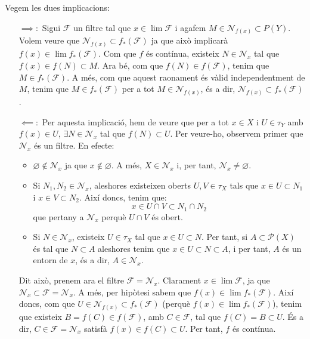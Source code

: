 \documentclass[10pt,a4paper]{article}
\begin{document}
\begin{enumerate}
            Vegem les dues implicacions:
            \begin{itemize}[leftmargin=0.95cm]
                  \item [$\implies:$] Sigui $\mathcal{F}$ un filtre tal que $x\in\lim\mathcal{F}$ i agafem $M\in\mathcal{N}_{f(x)}\subset P(Y)$. Volem veure que $\mathcal{N}_{f(x)}\subset f_*(\mathcal{F})$ ja que això implicarà $f(x)\in\lim f_*(\mathcal{F})$. Com que $f$ és contínua, existeix $N\in\mathcal{N}_x$ tal que $f(x)\in f(N)\subset M$. Ara bé, com que $f(N)\in f(\mathcal{F})$, tenim que $M\in f_*(\mathcal{F})$. A més, com que aquest raonament és vàlid independentment de $M$, tenim que $M\in f_*(\mathcal{F})$ per a tot $M\in\mathcal{N}_{f(x)}$, és a dir, $\mathcal{N}_{f(x)}\subset f_*(\mathcal{F})$.
                  \item [$\impliedby:$] Per aquesta implicació, hem de veure que per a tot $x\in X$ i $U\in\tau_Y$ amb $f(x)\in U$, $\exists N\in \mathcal{N}_x$ tal que $f(N)\subset U$. Per veure-ho, observem primer que $\mathcal{N}_x$ és un filtre. En efecte:
                        \begin{itemize}
                              \item $\varnothing\notin\mathcal{N}_x$ ja que $x\notin\varnothing$. A més, $X\in\mathcal{N}_x$ i, per tant, $\mathcal{N}_x\ne\varnothing$.
                              \item Si $N_1,N_2\in\mathcal{N}_x$, aleshores existeixen oberts $U,V\in\tau_X$ tals que $x\in U\subset N_1$ i $x\in V\subset N_2$. Així doncs, tenim que: $$x\in U\cap V\subset N_1\cap N_2$$ que pertany a $\mathcal{N}_x$ perquè $U\cap V$ és obert.
                              \item Si $N\in\mathcal{N}_x$, existeix $U\in\tau_X$ tal que $x\in U\subset N$. Per tant, si $A\subset\mathcal{P}(X)$ és tal que $N\subset A$ aleshores tenim que $x\in U\subset N\subset A$, i per tant, $A$ és un entorn de $x$, és a dir, $A\in\mathcal{N}_x$.
                        \end{itemize}
                        Dit això, prenem ara el filtre $\mathcal{F}= \mathcal{N}_x$. Clarament $x\in\lim\mathcal{F}$, ja que $\mathcal{N}_x\subset\mathcal{F}=\mathcal{N}_x$. A més, per hipòtesi sabem que $f(x)\in\lim f_*(\mathcal{F})$. Així doncs, com que $U\in\mathcal{N}_{f(x)}\subset f_*(\mathcal{F})$ (perquè $f(x)\in\lim f_*(\mathcal{F})$), tenim que existeix $B=f(C)\in f(\mathcal{F})$, amb $C\in\mathcal{F}$, tal que $f(C)=B\subset U$. És a dir, $C\in\mathcal{F}=\mathcal{N}_x$ satisfà $f(x)\in f(C)\subset U$. Per tant, $f$ és contínua.
            \end{itemize}
\end{enumerate}
\end{document}
